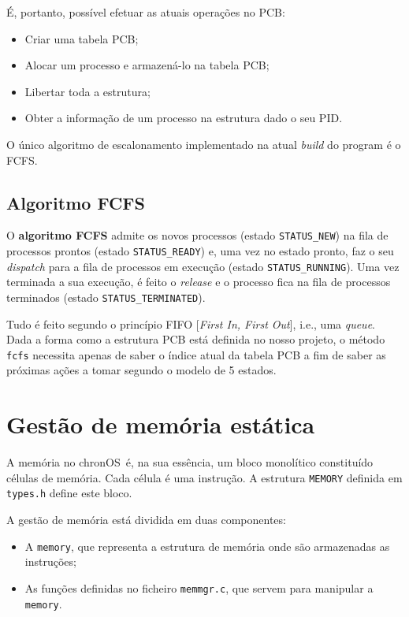 \documentclass[10pt,oneside]{estiloUBI}
\newcommand{\chronOS}{\textsf{chronOS}}
\begin{document}
	É, portanto, possível efetuar as atuais operações no \ac{PCB}:
	\begin{itemize}
	    \item Criar uma tabela \ac{PCB};
	    \item Alocar um processo e armazená-lo na tabela \ac{PCB};
	    \item Libertar toda a estrutura;
	    \item Obter a informação de um processo na estrutura dado o seu \ac{PID}.
	\end{itemize}
	
	O único algoritmo de escalonamento implementado na atual \textit{build} do program é o \ac{FCFS}.
	
	
	\section{Algoritmo \ac{FCFS}}
	\label{ssec:process:fcfs}
	
	O \textbf{algoritmo \ac{FCFS}} admite os novos processos (estado \texttt{STATUS\_NEW}) na fila de processos prontos (estado \texttt{STATUS\_READY}) e, uma vez no estado pronto, faz o seu \textit{dispatch} para a fila de processos em execução (estado \texttt{STATUS\_RUNNING}). Uma vez terminada a sua execução, é feito o \textit{release} e o processo fica na fila de processos terminados (estado \texttt{STATUS\_TERMINATED}).
	
	Tudo é feito segundo o princípio FIFO [\textit{First In, First Out}], i.e., uma \textit{queue}. Dada a forma como a estrutura \ac{PCB} está definida no nosso projeto, o método \verb|fcfs| necessita apenas de saber o índice atual da tabela \ac{PCB} a fim de saber as próximas ações a tomar segundo o modelo de 5 estados.
	
	
	\chapter{Gestão de memória estática}
	\label{sec:memory}
	
	A memória no \chronOS~é, na sua essência, um bloco monolítico constituído células de memória. Cada célula é uma instrução. A estrutura \verb|MEMORY| definida em \texttt{types.h} define este bloco.
	
	A gestão de memória está dividida em duas componentes:
	\begin{itemize}
		\item A \verb|memory|, que representa a estrutura de memória onde são armazenadas as instruções;
		\item As funções definidas no ficheiro \verb|memmgr.c|, que servem para manipular a \verb|memory|.
	\end{itemize}
	
\end{document}
